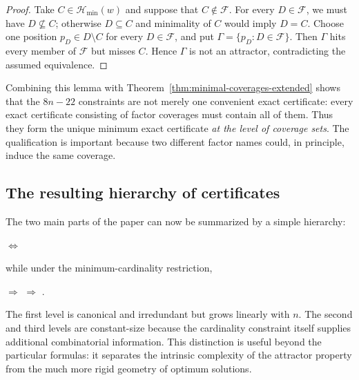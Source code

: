 \documentclass[10pt,a4paper]{article}
\theoremstyle{definition}\newtheorem{definition}[theorem]{Definition}
\theoremstyle{remark}\newtheorem{remark}[theorem]{Remark}
\newcommand{\Hmin}{\mathcal{H}_{\min}}
\begin{document}
\begin{proof}
Take $C\in\Hmin(w)$ and suppose that $C\notin\mathcal F$.  For every $D\in\mathcal F$, we must have $D\nsubseteq C$; otherwise $D\subseteq C$ and minimality of $C$ would imply $D=C$.  Choose one position
$
 p_D\in D\setminus C
$
for every $D\in\mathcal F$, and put
$
 \Gamma=\{p_D:D\in\mathcal F\}.
$
Then $\Gamma$ hits every member of $\mathcal F$ but misses $C$.  Hence $\Gamma$ is not an attractor, contradicting the assumed equivalence.
\end{proof}

Combining this lemma with Theorem~\ref{thm:minimal-coverages-extended} shows that the $8n-22$ constraints are not merely one convenient exact certificate: every exact certificate consisting of factor coverages must contain all of them.  Thus they form the unique minimum exact certificate \emph{at the level of coverage sets}.  The qualification is important because two different factor names could, in principle, induce the same coverage.

\subsection{The resulting hierarchy of certificates}
\label{subsec:certificate-hierarchy}

The two main parts of the paper can now be summarized by a simple hierarchy:
\begin{center}
$\Longleftrightarrow$
\end{center}
while under the minimum-cardinality restriction,
\begin{center}
$\Longrightarrow$
$\Longrightarrow$
.
\end{center}

The first level is canonical and irredundant but grows linearly with $n$.  The second and third levels are constant-size because the cardinality constraint itself supplies additional combinatorial information.  This distinction is useful beyond the particular formulas: it separates the intrinsic complexity of the attractor property from the much more rigid geometry of optimum solutions.





\end{document}
